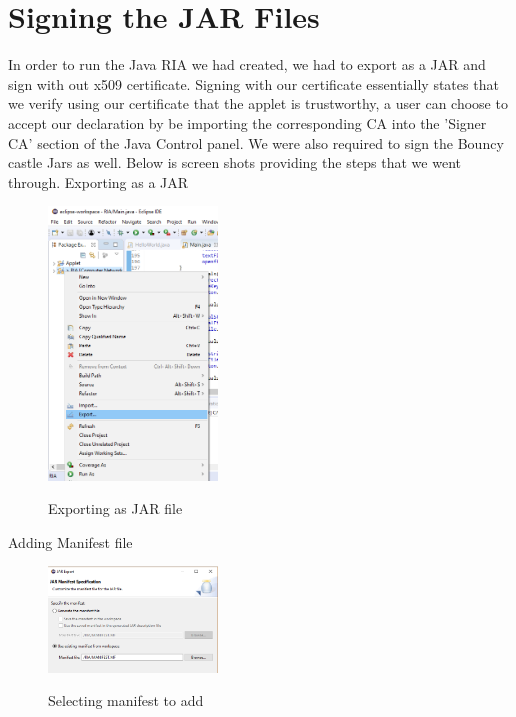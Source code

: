 \section{Signing the JAR Files}

In order to run the Java RIA we had created, we had to export as a JAR and sign with out x509 certificate. Signing with our certificate essentially states that we verify using our certificate that the applet is trustworthy, a user can choose to accept our declaration by be importing the corresponding CA into the 'Signer CA' section of the Java Control panel. We were also required to sign the Bouncy castle Jars as well. Below is screen shots providing the steps that we went through.
\newpage
\noindent Exporting as a JAR

\begin{figure}[hbt!]
	\centering
      \includegraphics[width=0.4\textwidth]{imgs/jarsign/export} \\
	\caption{Exporting as JAR file}
	\label{fig:specifiyingkeysize}
    \noindent\makebox[\linewidth]{}
\end{figure}

\noindent Adding Manifest file

\begin{figure}[hbt!]
	\centering
      \includegraphics[width=0.4\textwidth]{imgs/jarsign/manifest_apply} \\
	\caption{Selecting manifest to add}
	\label{fig:specifiyingkeysize}
    \noindent\makebox[\linewidth]{}
\end{figure}


